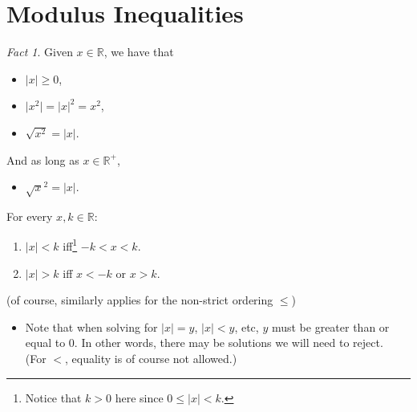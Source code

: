 \documentclass[oneside]{book}
\theoremstyle{definition}
\theoremstyle{plain}
\theoremstyle{remark}
\newtheorem*{fact}{Fact}
\theoremstyle{plain}
\begin{document}
\section{Modulus Inequalities}
\begin{fact}
    Given \(x \in \mathbb{R}\), we have that 
    \begin{itemize}
        \item \(\lvert x \rvert \geq 0\),
        \item \(\lvert x^2 \rvert=\lvert x \rvert^2=x^2\),
        \item \(\sqrt{x^2}=\lvert x \rvert\).
    \end{itemize}
    And as long as \(x \in \mathbb{R}^+\),
    \begin{itemize}
        \item \(\sqrt{x}^2=\lvert x \rvert\).
    \end{itemize}
\end{fact}
\begin{tcolorbox}[
    colback=yellow!20,
    boxrule=1pt,
    boxsep=1pt,
    left=2pt,right=2pt,top=2pt,bottom=2pt,
    oversize=2pt,
    colframe=blue!75!black,
    before skip=\topsep,
    after skip=\topsep,
    title=Useful Properties,
]
    For every \(x,k \in \mathbb{R}\):
    \begin{enumerate}[label=(\alph*)]
        \item \(\lvert x \rvert < k\) iff\footnote{Notice that \(k>0\) here since \(0 \leq \lvert x \rvert < k\).} \(-k<x<k\).
        \item \(\lvert x \rvert > k\) iff \(x<-k\) or \(x>k\).
    \end{enumerate}
    \footnotesize (of course, similarly applies for the non-strict ordering \(\leq\)) \normalsize
\end{tcolorbox}
\begin{IN}
    \begin{itemize}[label=\(\circ\)]
        \item Note that when solving for \(\lvert x \rvert=y\), \(\lvert x \rvert < y\), etc, \(y\) must be greater than or equal to 0. In other words, there may be solutions we will need to reject.\\ \footnotesize(For \(<\), equality is of course not allowed.)\normalsize  
    \end{itemize}
\end{IN}
\end{document}
